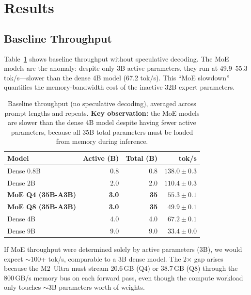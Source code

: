 \documentclass[11pt,a4paper]{article}
\begin{document}
\section{Results}

\subsection{Baseline Throughput}

Table~\ref{tab:baseline} shows baseline throughput without speculative decoding. The MoE models are the anomaly: despite only 3B active parameters, they run at 49.9--55.3 tok/s---slower than the dense 4B model (67.2 tok/s). This ``MoE slowdown'' quantifies the memory-bandwidth cost of the inactive 32B expert parameters.

\begin{table}[h]
\centering
\caption{Baseline throughput (no speculative decoding), averaged across prompt lengths and repeats. \textbf{Key observation:} the MoE models are slower than the dense 4B model despite having fewer active parameters, because all 35B total parameters must be loaded from memory during inference.}
\label{tab:baseline}
\begin{tabular}{@{}lrrr@{}}
\toprule
\textbf{Model} & \textbf{Active (B)} & \textbf{Total (B)} & \textbf{tok/s} \\
\midrule
Dense 0.8B & 0.8 & 0.8 & $138.0 \pm 0.3$ \\
Dense 2B   & 2.0 & 2.0 & $110.4 \pm 0.3$ \\
\rowcolor{moecolor!8}
\textbf{MoE Q4 (35B-A3B)} & \textbf{3.0} & \textbf{35} & $\mathbf{55.3 \pm 0.1}$ \\
\rowcolor{moecolor!8}
\textbf{MoE Q8 (35B-A3B)} & \textbf{3.0} & \textbf{35} & $\mathbf{49.9 \pm 0.1}$ \\
Dense 4B   & 4.0 & 4.0 & $67.2 \pm 0.1$ \\
Dense 9B   & 9.0 & 9.0 & $33.4 \pm 0.0$ \\
\bottomrule
\end{tabular}
\end{table}

If MoE throughput were determined solely by active parameters (3B), we would expect $\sim$100+ tok/s, comparable to a 3B dense model. The 2$\times$ gap arises because the M2~Ultra must stream 20.6\,GB (Q4) or 38.7\,GB (Q8) through the 800\,GB/s memory bus on each forward pass, even though the compute workload only touches $\sim$3B parameters worth of weights.
\end{document}
